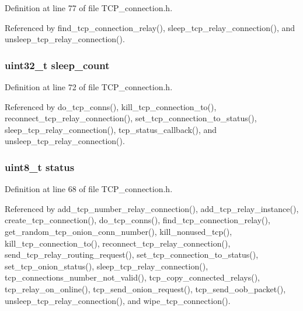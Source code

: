 Definition at line 77 of file T\+C\+P\+\_\+connection.\+h.



Referenced by find\+\_\+tcp\+\_\+connection\+\_\+relay(), sleep\+\_\+tcp\+\_\+relay\+\_\+connection(), and unsleep\+\_\+tcp\+\_\+relay\+\_\+connection().

\hypertarget{struct_t_c_p__con_aa67ab512ed25830e7b9ea3c7069a9555}{
\subsubsection[{sleep\+\_\+count}]{\setlength{\rightskip}{0pt plus 5cm}uint32\+\_\+t sleep\+\_\+count}}\label{struct_t_c_p__con_aa67ab512ed25830e7b9ea3c7069a9555}


Definition at line 72 of file T\+C\+P\+\_\+connection.\+h.



Referenced by do\+\_\+tcp\+\_\+conns(), kill\+\_\+tcp\+\_\+connection\+\_\+to(), reconnect\+\_\+tcp\+\_\+relay\+\_\+connection(), set\+\_\+tcp\+\_\+connection\+\_\+to\+\_\+status(), sleep\+\_\+tcp\+\_\+relay\+\_\+connection(), tcp\+\_\+status\+\_\+callback(), and unsleep\+\_\+tcp\+\_\+relay\+\_\+connection().

\hypertarget{struct_t_c_p__con_ade818037fd6c985038ff29656089758d}{
\subsubsection[{status}]{\setlength{\rightskip}{0pt plus 5cm}uint8\+\_\+t status}}\label{struct_t_c_p__con_ade818037fd6c985038ff29656089758d}


Definition at line 68 of file T\+C\+P\+\_\+connection.\+h.



Referenced by add\+\_\+tcp\+\_\+number\+\_\+relay\+\_\+connection(), add\+\_\+tcp\+\_\+relay\+\_\+instance(), create\+\_\+tcp\+\_\+connection(), do\+\_\+tcp\+\_\+conns(), find\+\_\+tcp\+\_\+connection\+\_\+relay(), get\+\_\+random\+\_\+tcp\+\_\+onion\+\_\+conn\+\_\+number(), kill\+\_\+nonused\+\_\+tcp(), kill\+\_\+tcp\+\_\+connection\+\_\+to(), reconnect\+\_\+tcp\+\_\+relay\+\_\+connection(), send\+\_\+tcp\+\_\+relay\+\_\+routing\+\_\+request(), set\+\_\+tcp\+\_\+connection\+\_\+to\+\_\+status(), set\+\_\+tcp\+\_\+onion\+\_\+status(), sleep\+\_\+tcp\+\_\+relay\+\_\+connection(), tcp\+\_\+connections\+\_\+number\+\_\+not\+\_\+valid(), tcp\+\_\+copy\+\_\+connected\+\_\+relays(), tcp\+\_\+relay\+\_\+on\+\_\+online(), tcp\+\_\+send\+\_\+onion\+\_\+request(), tcp\+\_\+send\+\_\+oob\+\_\+packet(), unsleep\+\_\+tcp\+\_\+relay\+\_\+connection(), and wipe\+\_\+tcp\+\_\+connection().

